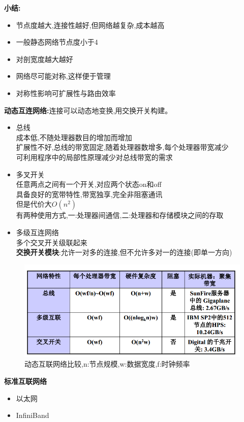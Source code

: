 \documentclass[UTF8,a4paper]{ctexart}
\newcommand{\spaceline}{\vspace{\baselineskip}}
\begin{document}
  \textbf{小结:}
  \begin{itemize}
    \item 节点度越大,连接性越好,但网络越复杂,成本越高
    \item 一般静态网络节点度小于4
    \item 对剖宽度越大越好
    \item 网络尽可能对称,这样便于管理
    \item 对称性影响可扩展性与路由效率
  \end{itemize}

  \spaceline
  \textbf{动态互连网络:}连接可以动态地变换,用交换开关构建。
  \begin{itemize}
    \item 总线\\
    成本低,不随处理器数目的增加而增加\\
    扩展性不好,总线的带宽固定,随着处理器数增多,每个处理器带宽减少\\
    可利用程序中的局部性原理减少对总线带宽的需求
    \item 多叉开关\\
    任意两点之间有一个开关,对应两个状态on和off\\
    具备良好的宽带特性,带宽独享,完全非阻塞通讯\\
    但是代价大$O(n^2)$\\
    有两种使用方式,一:处理器间通信,二:处理器和存储模块之间的存取\\
    \item 多级互连网络\\
    多个交叉开关级联起来\\
    \textbf{交换开关模块}:允许一对多的连接,但不允许多对一的连接(即单一方向)
  \end{itemize}

  \begin{figure}[H]
    \centering
    \includegraphics[scale = 0.5]{assets/ParallelComputing_3cbfc.png}
    \caption{动态互联网络比较,n:节点规模,w:数据宽度,f:时钟频率}
  \end{figure}

  \spaceline
  \textbf{标准互联网络}
  \begin{itemize}
    \item 以太网
    \item InfiniBand
  \end{itemize}
\end{document}
